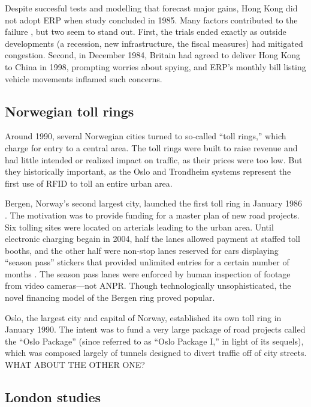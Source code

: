 Despite succesful tests and modelling that forecast major gains, Hong Kong did not adopt ERP when study concluded in 1985. Many factors contributed to the failure \citep{Hau1990,Borins1988}, but two seem to stand out. First, the trials ended exactly as outside developments (a recession, new infrastructure, the fiscal measures) had mitigated congestion. Second, in December 1984, Britain had agreed to deliver Hong Kong to China in 1998, prompting worries about spying, and ERP's monthly bill listing vehicle movements inflamed such concerns.

\subsection{Norwegian toll rings}

Around 1990, several Norwegian cities turned to so-called ``toll rings,'' which charge for entry to a central area. The toll rings were built to raise revenue and had little intended or realized impact on traffic, as their prices were too low. But they historically important, as the Oslo and Trondheim systems represent the first use of RFID to toll an entire urban area.

Bergen, Norway's second largest city, launched the first toll ring in January 1986 \citep{Ieromonachou2006}. The motivation was to provide funding for a master plan of new road projects. Six tolling sites were located on arterials leading to the urban area. Until electronic charging begain in 2004, half the lanes allowed payment at staffed toll booths, and the other half were non-stop lanes reserved for cars displaying ``season pass'' stickers that provided unlimited entries for a certain number of months \citep{Ramjerdi2004}. The season pass lanes were enforced by human inspection of footage from video cameras---not ANPR. Though technologically unsophisticated, the novel financing model of the Bergen ring proved popular.

Oslo, the largest city and capital of Norway, established its own toll ring in January 1990. The intent was to fund a very large package of road projects called the ``Oslo Package'' (since referred to as ``Oslo Package I,'' in light of its sequels), which was composed largely of tunnels designed to divert traffic off of city streets. WHAT ABOUT THE OTHER ONE?

\subsection{London studies}

